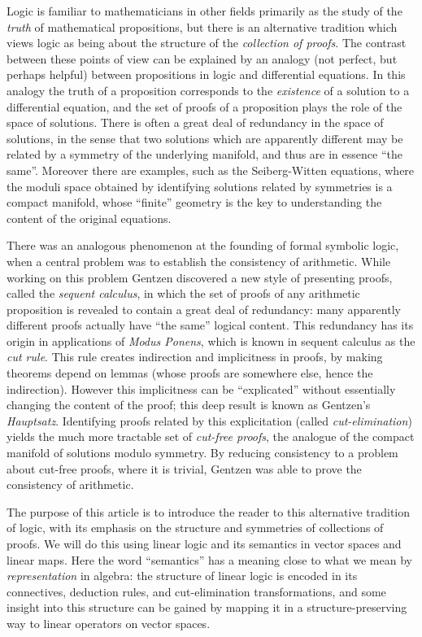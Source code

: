 \documentclass[english,letter paper,12pt,reqno]{article}
\theoremstyle{example}
\numberwithin{equation}{section}
\begin{document}
Logic is familiar to mathematicians in other fields primarily as the study of the \emph{truth} of mathematical propositions, but there is an alternative tradition which views logic as being about the structure of the \emph{collection of proofs}. The contrast between these points of view can be explained by an analogy (not perfect, but perhaps helpful) between propositions in logic and differential equations. In this analogy the truth of a proposition corresponds to the \emph{existence} of a solution to a differential equation, and the set of proofs of a proposition plays the role of the space of solutions. There is often a great deal of redundancy in the space of solutions, in the sense that two solutions which are apparently different may be related by a symmetry of the underlying manifold, and thus are in essence ``the same''. Moreover there are examples, such as the Seiberg-Witten equations, where the moduli space obtained by identifying solutions related by symmetries is a compact manifold, whose ``finite'' geometry is the key to understanding the content of the original equations.

There was an analogous phenomenon at the founding of formal symbolic logic, when a central problem was to establish the consistency of arithmetic. While working on this problem Gentzen discovered a new style of presenting proofs, called the \emph{sequent calculus}, in which the set of proofs of any arithmetic proposition is revealed to contain a great deal of redundancy: many apparently different proofs actually have ``the same'' logical content. This redundancy has its origin in applications of \emph{Modus Ponens}, which is known in sequent calculus as the \emph{cut rule}. This rule creates indirection and implicitness in proofs, by making theorems depend on lemmas (whose proofs are somewhere else, hence the indirection). However this implicitness can be ``explicated'' without essentially changing the content of the proof; this deep result is known as Gentzen's \emph{Hauptsatz}. Identifying proofs related by this explicitation (called \emph{cut-elimination}) yields the much more tractable set of \emph{cut-free proofs}, the analogue of the compact manifold of solutions modulo symmetry. By reducing consistency to a problem about cut-free proofs, where it is trivial, Gentzen was able to prove the consistency of arithmetic.

\vspace{0.3cm}

The purpose of this article is to introduce the reader to this alternative tradition of logic, with its emphasis on the structure and symmetries of collections of proofs. We will do this using linear logic and its semantics in vector spaces and linear maps. Here the word ``semantics'' has a meaning close to what we mean by \emph{representation} in algebra: the structure of linear logic is encoded in its connectives, deduction rules, and cut-elimination transformations, and some insight into this structure can be gained by mapping it in a structure-preserving way to linear operators on vector spaces.
\end{document}
